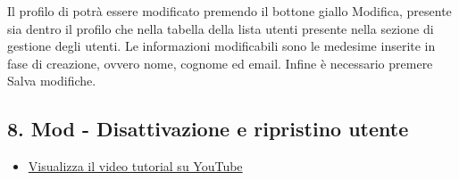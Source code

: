 		Il profilo di potrà essere modificato premendo il bottone giallo Modifica, presente sia dentro il profilo che nella tabella della lista utenti presente nella sezione di gestione degli utenti.
		Le informazioni modificabili sono le medesime inserite in fase di creazione, ovvero nome, cognome ed email.
		Infine è necessario premere Salva modifiche.



\newpage \subsection{8. Mod - Disattivazione e ripristino utente}

	\begin{itemize}
		\item \href{https://www.youtube.com/watch?v=PjySMOLCtMA&list=PLPKYjnuIh1FA3b3jn_bwY_ztYzaFn2mIT&index=11}{Visualizza il video tutorial su YouTube} 
	\end{itemize}


